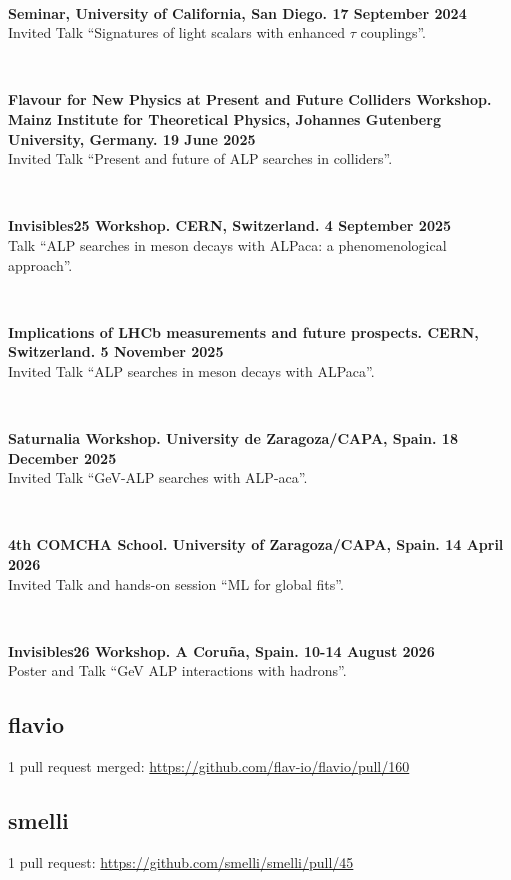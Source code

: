\documentclass{cvf}
\begin{document}
~

\textbf{Seminar, University of California, San Diego. 17 September 2024}\\
Invited Talk ``Signatures of light scalars with enhanced $\tau$ couplings''.

~

\textbf{Flavour for New Physics at Present and Future Colliders Workshop. Mainz Institute for Theoretical Physics, Johannes Gutenberg University, Germany. 19 June 2025}\\
Invited Talk ``Present and future of ALP searches in colliders''.

~

\textbf{Invisibles25 Workshop. CERN, Switzerland. 4 September 2025}\\
Talk ``ALP searches in meson decays with ALPaca: a phenomenological approach''.

~

\textbf{Implications of LHCb measurements and future prospects. CERN, Switzerland. 5 November 2025}\\
Invited Talk ``ALP searches in meson decays with ALPaca''.

~

\textbf{Saturnalia Workshop. University de Zaragoza/CAPA, Spain. 18 December 2025}\\
Invited Talk ``GeV-ALP searches with ALP-aca''.

~

\textbf{4th COMCHA School. University of Zaragoza/CAPA, Spain. 14 April 2026}\\
Invited Talk and hands-on session ``ML for global fits''.

~

\textbf{Invisibles26 Workshop. A Coru\~na, Spain. 10-14 August 2026}\\
Poster and Talk ``GeV ALP interactions with hadrons''.


\subsection{flavio}
1 pull request merged: \url{https://github.com/flav-io/flavio/pull/160}

\subsection{smelli}
1 pull request: \url{https://github.com/smelli/smelli/pull/45}
\end{document}
